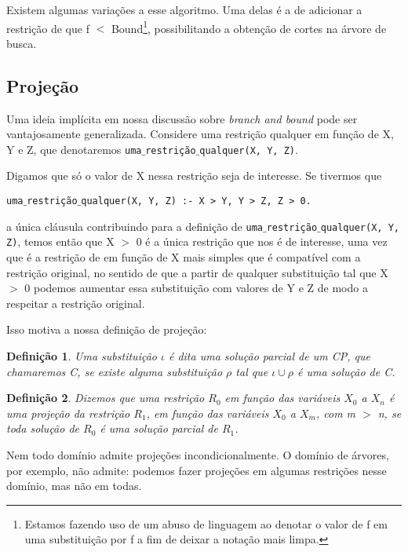 \documentclass{article}
\newtheorem{definition}{Definição}[section]
\theoremstyle{remark}
\theoremstyle{theorem}
\begin{document}
Existem algumas variações a esse algoritmo. Uma delas é a de adicionar a restrição de que f $<$ Bound\footnote{Estamos fazendo uso de um abuso de linguagem ao denotar o valor de f em uma substituição por f a fim de deixar a notação mais limpa.}, possibilitando a obtenção de cortes na árvore de busca.

\subsection{Projeção}

Uma ideia implícita em nossa discussão sobre \textit{branch and bound} pode ser vantajosamente generalizada. Considere uma restrição qualquer em função de X, Y e Z, que denotaremos {\tt uma$\_$restrição$\_$qualquer(X, Y, Z)}.

Digamos que só o valor de X nessa restrição seja de interesse. Se tivermos que

{\tt uma$\_$restrição$\_$qualquer(X, Y, Z) :- X > Y, Y > Z, Z > 0.}

 a única cláusula contribuindo para a definição de {\tt uma$\_$restrição$\_$qualquer(X, Y, Z)}, temos então que X $>$ 0
é a única restrição que nos é de interesse, uma vez que é a restrição de em função de X mais simples que é compatível com a restrição original, no sentido de que a partir de qualquer substituição tal que X $>$ 0 podemos aumentar essa substituição com valores de Y e Z de modo a respeitar a restrição original.

Isso motiva a nossa definição de projeção:

\begin{definition}
  Uma substituição $\iota$ é dita uma solução parcial de um CP, que chamaremos C, se existe alguma substituição $\rho$ tal que $\iota \cup \rho$ é uma solução de C.
\end{definition}

\begin{definition}
  Dizemos que uma restrição $R_0$ em função das variáveis $X_0$ a $X_n$ é uma projeção da restrição $R_1$, em função das variáveis $X_0$ a $X_m$, com m $>$ n, se toda solução de $R_0$ é uma solução parcial de $R_1$.
\end{definition}

Nem todo domínio admite projeções incondicionalmente. O domínio de árvores, por exemplo, não admite: podemos fazer projeções em algumas restrições nesse domínio, mas não em todas.
\end{document}
